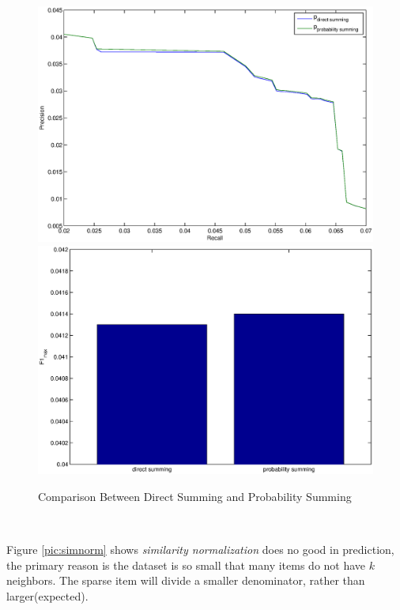 \documentclass[11pt,a4paper,titlepage]{article}
\begin{document}
\begin{figure}[!h]
\includegraphics[width=\linewidth]{./summing_compare.eps}
\includegraphics[width=\linewidth]{./summing_compare_f1.eps}
\caption{Comparison Between Direct Summing and Probability Summing}
\label{pic:sumcomp}
\end{figure}

~

Figure \ref{pic:simnorm} shows \emph{similarity normalization} does no good in prediction, the primary reason is the dataset is so small that many items do not have $k$ neighbors. The sparse item will divide a smaller denominator, rather than larger(expected).
\end{document}
